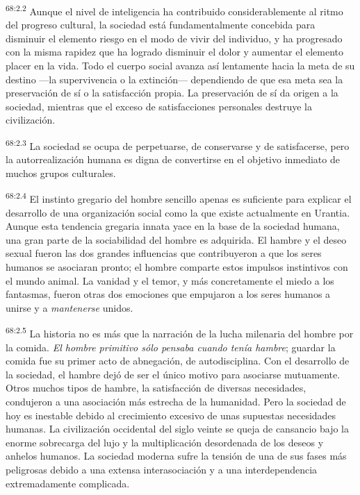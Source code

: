 \documentclass[twoside, 11pt]{book}
\begin{document}
\par
\textsuperscript{68:2.2} Aunque el nivel de inteligencia ha contribuido considerablemente al ritmo del progreso cultural, la sociedad está fundamentalmente concebida para disminuir el elemento riesgo en el modo de vivir del individuo, y ha progresado con la misma rapidez que ha logrado disminuir el dolor y aumentar el elemento placer en la vida. Todo el cuerpo social avanza así lentamente hacia la meta de su destino ---la supervivencia o la extinción--- dependiendo de que esa meta sea la preservación de sí o la satisfacción propia. La preservación de sí da origen a la sociedad, mientras que el exceso de satisfacciones personales destruye la civilización.

\par
\textsuperscript{68:2.3} La sociedad se ocupa de perpetuarse, de conservarse y de satisfacerse, pero la autorrealización humana es digna de convertirse en el objetivo inmediato de muchos grupos culturales.

\par
\textsuperscript{68:2.4} El instinto gregario del hombre sencillo apenas es suficiente para explicar el desarrollo de una organización social como la que existe actualmente en Urantia. Aunque esta tendencia gregaria innata yace en la base de la sociedad humana, una gran parte de la sociabilidad del hombre es adquirida. El hambre y el deseo sexual fueron las dos grandes influencias que contribuyeron a que los seres humanos se asociaran pronto; el hombre comparte estos impulsos instintivos con el mundo animal. La vanidad y el temor, y más concretamente el miedo a los fantasmas, fueron otras dos emociones que empujaron a los seres humanos a unirse y a \textit{mantenerse} unidos.

\par
\textsuperscript{68:2.5} La historia no es más que la narración de la lucha milenaria del hombre por la comida. \textit{El hombre primitivo sólo pensaba cuando tenía hambre}; guardar la comida fue su primer acto de abnegación, de autodisciplina. Con el desarrollo de la sociedad, el hambre dejó de ser el único motivo para asociarse mutuamente. Otros muchos tipos de hambre, la satisfacción de diversas necesidades, condujeron a una asociación más estrecha de la humanidad. Pero la sociedad de hoy es inestable debido al crecimiento excesivo de unas supuestas necesidades humanas. La civilización occidental del siglo veinte se queja de cansancio bajo la enorme sobrecarga del lujo y la multiplicación desordenada de los deseos y anhelos humanos. La sociedad moderna sufre la tensión de una de sus fases más peligrosas debido a una extensa interasociación y a una interdependencia extremadamente complicada.
\end{document}
